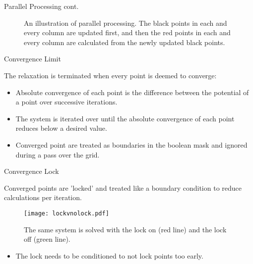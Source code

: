 \documentclass{beamer}
\begin{document}
\begin{frame}{Parallel Processing cont.}

\begin{figure}
\begin{center}
\end{center}
\caption{An illustration of parallel processing. The black points in each and every
column are updated first, and then the red points in each and every column are
calculated from the newly updated black points.}
\end{figure}

\end{frame}

\begin{frame}{Convergence Limit}

The relaxation is terminated when every point is deemed to converge:
\begin{itemize}
\item Absolute convergence of each point is the difference between the potential of a
      point over successive iterations.
\item The system is iterated over until the absolute convergence of each point reduces below a desired value.
\item Converged point are treated as boundaries in the boolean mask and ignored during a pass over the grid.
\end{itemize}

\end{frame}

\begin{frame}{Convergence Lock}

Converged points are 'locked' and treated like a boundary condition to reduce
calculations per iteration.

\begin{figure}
 \centering
 \centerline{\texttt{[image: lockvnolock.pdf]}}
 \caption{The same system is solved with the lock on (red line) and the lock off (green line).}
\end{figure}

\begin{itemize}
\item The lock needs to be conditioned to not lock points too early.
\end{itemize}

\end{frame}
\end{document}
